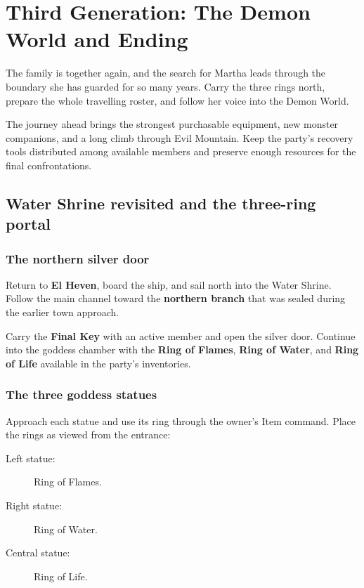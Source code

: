 \chapter{Third Generation: The Demon World and Ending}
\label{written-finale}

The family is together again, and the search for Martha leads
through the boundary she has guarded for so many years. Carry
the three rings north, prepare the whole travelling roster,
and follow her voice into the Demon World.

The journey ahead brings the strongest purchasable equipment,
new monster companions, and a long climb through Evil Mountain.
Keep the party's recovery tools distributed among available
members and preserve enough resources for the final confrontations.

\section{Water Shrine revisited and the three-ring portal}

\subsection*{The northern silver door}

Return to \textbf{El Heven}, board the ship, and sail north
into the Water Shrine. Follow the main channel toward the
\textbf{northern branch} that was sealed during the earlier
town approach.

Carry the \textbf{Final Key} with an active member and open
the silver door. Continue into the goddess chamber with the
\textbf{Ring of Flames}, \textbf{Ring of Water}, and
\textbf{Ring of Life} available in the party's inventories.

\subsection*{The three goddess statues}

Approach each statue and use its ring through the owner's
Item command. Place the rings as viewed from the entrance:
\begin{description}
  \item[Left statue:] Ring of Flames.
  \item[Right statue:] Ring of Water.
  \item[Central statue:] Ring of Life.
\end{description}

